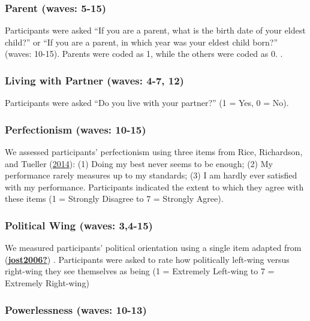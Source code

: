 \documentclass[
  singlecolumn]{report}
\begin{document}
\hypertarget{parent-waves-5-15}{%
\subsubsection{Parent (waves: 5-15)}\label{parent-waves-5-15}}

Participants were asked ``If you are a parent, what is the birth date of
your eldest child?'' or ``If you are a parent, in which year was your
eldest child born?'' (waves: 10-15). Parents were coded as 1, while the
others were coded as 0. .

\hypertarget{living-with-partner-waves-4-7-12}{%
\subsubsection{Living with Partner (waves: 4-7,
12)}\label{living-with-partner-waves-4-7-12}}

Participants were asked ``Do you live with your partner?'' (1 = Yes, 0 =
No).

\hypertarget{perfectionism-waves-10-15}{%
\subsubsection{Perfectionism (waves:
10-15)}\label{perfectionism-waves-10-15}}

We assessed participants' perfectionism using three items from Rice,
Richardson, and Tueller (\protect\hyperlink{ref-rice_short_2014}{2014}):
(1) Doing my best never seems to be enough; (2) My performance rarely
measures up to my standards; (3) I am hardly ever satisfied with my
performance. Participants indicated the extent to which they agree with
these items (1 = Strongly Disagree to 7 = Strongly Agree).

\hypertarget{political-wing-waves-34-15}{%
\subsubsection{Political Wing (waves:
3,4-15)}\label{political-wing-waves-34-15}}

We measured participants' political orientation using a single item
adapted from (\protect\hyperlink{ref-jost2006}{\textbf{jost2006?}}) .
Participants were asked to rate how politically left-wing versus
right-wing they see themselves as being (1 = Extremely Left-wing to 7 =
Extremely Right-wing)

\hypertarget{powerlessness-waves-10-13}{%
\subsubsection{Powerlessness (waves:
10-13)}\label{powerlessness-waves-10-13}}
\end{document}

